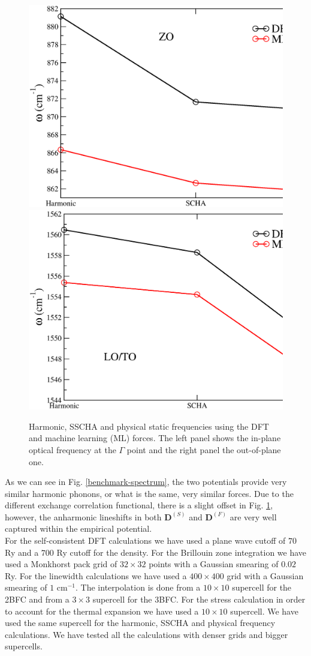 \begin{figure}[ht]
\includegraphics[width=0.49\linewidth]{Figures/bm1.eps}
\includegraphics[width=0.49\linewidth]{Figures/bm2.eps}
\caption[Harmonic, SSCHA and physical static frequencies using the DFT and machine learning (ML) forces.]{Harmonic, 
	SSCHA and physical static frequencies using the DFT and machine learning (ML) forces. The left panel shows 
	the in-plane optical frequency at the $\Gamma$ point and the right panel the out-of-plane one.}
\label{benchmark}
\end{figure}
As we can see in Fig. \ref{benchmark-spectrum}, the two potentials provide very similar harmonic phonons, or what is 
the same, very similar forces. Due to the different exchange correlation functional, there is a slight offset in 
Fig. \ref{benchmark}, however, the anharmonic lineshifts in both $\boldsymbol{D}^{(S)}$ and $\boldsymbol{D}^{(F)}$ 
are very well captured within the empirical potential. \\

For the self-consistent DFT calculations we have used a plane wave cutoff of $70$ Ry and a $700$ Ry cutoff for the 
density. For the Brillouin zone integration we have used a Monkhorst pack grid\cite{monkhorst1976special} of 
$32\times32$ points with a Gaussian smearing of $0.02$ Ry. For the linewidth calculations we have 
used a $400\times400$ grid with a Gaussian smearing of $1$ cm$^{-1}$. The interpolation is done from a 
$10\times10$ supercell for the 2BFC and from a $3\times3$ supercell for the 3BFC. For the stress calculation in order 
to account for the thermal expansion we have used a $10\times10$ supercell. We have used the same supercell for 
the harmonic, SSCHA and physical frequency calculations. We have tested all the calculations with denser grids and 
bigger supercells.

